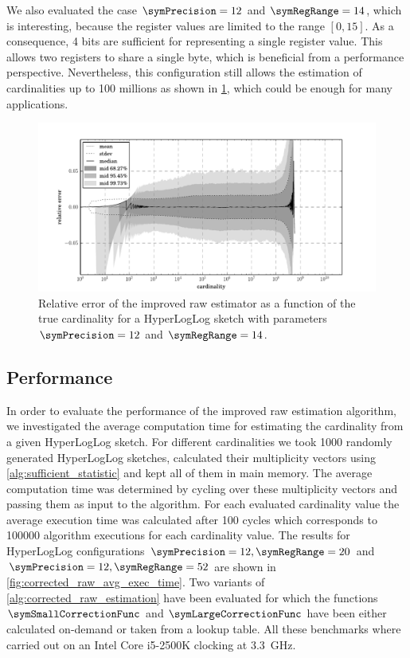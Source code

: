 \documentclass[a4paper]{scrartcl}
\begin{document}
We also evaluated the case $\symPrecision = 12$ and $\symRegRange=14$, which is interesting, because the register values are limited to the range $[0, 15]$. As a consequence, 4 bits are sufficient for representing a single register value. This allows two registers to share a single byte, which is beneficial from a performance perspective. Nevertheless, this configuration still allows the estimation of cardinalities up to 100 millions as shown in \cref{fig:raw_corrected_estimation_error_12_14}, which could be enough for many applications.

\begin{figure}
\centering
\includegraphics[width=1\textwidth]{raw_corrected_estimate_12_14}
\caption{Relative error of the improved raw estimator as a function of the true cardinality for a HyperLogLog sketch with parameters $\symPrecision = 12$ and $\symRegRange=14$.}
\label{fig:raw_corrected_estimation_error_12_14}
\end{figure}

\subsection{Performance}
\label{sec:corrected_raw_estimation_algorithm}
In order to evaluate the performance of the improved raw estimation algorithm, we investigated the average computation time for estimating the cardinality from a given HyperLogLog sketch. For different cardinalities we took \num{1000} randomly generated HyperLogLog sketches, calculated their 
multiplicity vectors using \cref{alg:sufficient_statistic} and kept all of them in main memory. The average computation time was determined by cycling over these multiplicity vectors and passing them as input to the algorithm. For each evaluated cardinality value the average execution time was calculated after 100 cycles which corresponds to \num{100000} algorithm executions for each cardinality value. The results for HyperLogLog configurations $\symPrecision=12, \symRegRange=20$ and $\symPrecision=12, \symRegRange=52$ are shown in \cref{fig:corrected_raw_avg_exec_time}. Two variants of \cref{alg:corrected_raw_estimation} have been evaluated for which the functions $\symSmallCorrectionFunc$ and $\symLargeCorrectionFunc$ have been either calculated on-demand or taken from a lookup table. All these benchmarks where carried out on an Intel Core i5-2500K clocking at \SI{3.3}{\giga\hertz}. 
\end{document}
